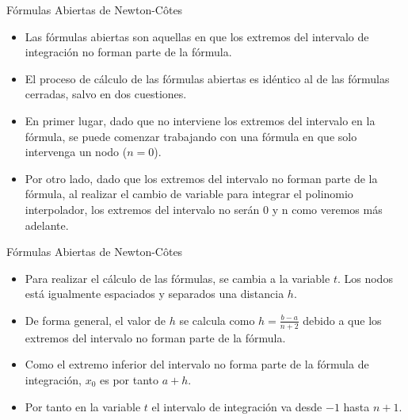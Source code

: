 \documentclass[12pt]{beamer}
\begin{document}
\begin{frame}{F\'ormulas Abiertas de Newton-C\^otes}
  \begin{itemize}
    \item Las fórmulas abiertas son aquellas en que los extremos del intervalo de integración no forman parte de la
    fórmula.
    \item<2->El proceso de cálculo de las fórmulas abiertas es idéntico al de las fórmulas cerradas, salvo en dos
    cuestiones.
    \item<3->En primer lugar, dado que no interviene los extremos del intervalo en la fórmula, se puede comenzar trabajando con una fórmula en que solo intervenga un nodo ($n=0$).
    \item<4-> Por otro lado, dado que los
    extremos del intervalo no forman parte de la fórmula, al realizar el cambio de variable para integrar el polinomio interpolador, los extremos del intervalo no serán 0 y n como veremos más adelante.
  \end{itemize}
\end{frame}
\begin{frame}{F\'ormulas Abiertas de Newton-C\^otes}
  \begin{itemize}
    \item Para realizar el cálculo de las fórmulas, se cambia a la variable $t$. Los nodos está igualmente espaciados y
    separados una distancia $h$.
    \item<2-> De forma general, el valor de $h$ se calcula como $h=\frac{b-a}{n+2}$ debido a que los extremos del intervalo no forman parte de la fórmula.
    \item<3-> Como el extremo inferior del intervalo no forma parte de la fórmula de integración, $x_0$ es por tanto $a + h$.
    \item<4-> Por tanto en la variable $t$ el intervalo de integración va desde $-1$ hasta $n+1$.
  \end{itemize}
  \begin{center}  
\end{center}
\end{frame}
\end{document}
